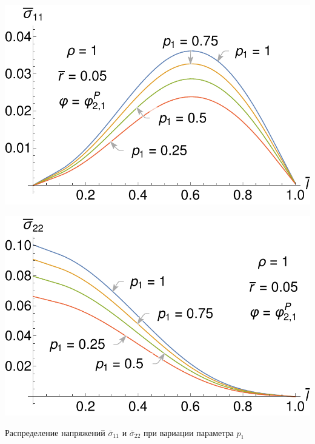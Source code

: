 \begin{frame}
\begin{minipage}{0.45\textwidth}
	\centering
	\includegraphics[width=\textwidth]{pics/ThermalKirshSigma11VariationP1Presentation.pdf} \\
\end{minipage}
\begin{minipage}{0.45\textwidth}
	\centering
	\includegraphics[width=\textwidth]{pics/ThermalKirshSigma22VariationP1Presentation.pdf} \\
\end{minipage}

Распределение напряжений $\overline{\sigma}_{11}$ и $\overline{\sigma}_{22}$ при вариации параметра $p_1$
\end{frame}